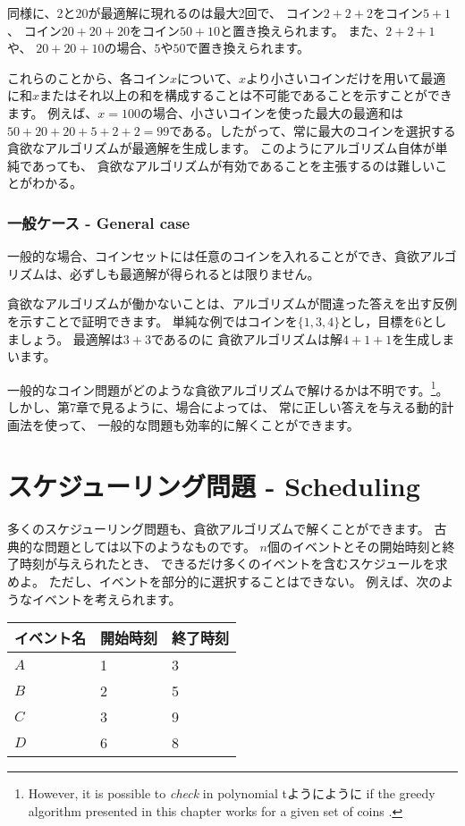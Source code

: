 同様に、2と20が最適解に現れるのは最大2回で、
コイン$2+2+2$をコイン$5+1$、
コイン$20+20+20$をコイン$50+10$と置き換えられます。
また、$2+2+1$ や、 $20+20+10$の場合、$5$や$50$で置き換えられます。

これらのことから、各コイン$x$について、$x$より小さいコインだけを用いて最適に和$x$またはそれ以上の和を構成することは不可能であることを示すことができます。
例えば、$x = 100$の場合、小さいコインを使った最大の最適和は$50+20+20+5+2+2 = 99$である。したがって、常に最大のコインを選択する貪欲なアルゴリズムが最適解を生成します。
このようにアルゴリズム自体が単純であっても、
貪欲なアルゴリズムが有効であることを主張するのは難しいことがわかる。

\subsubsection{一般ケース - General case}

一般的な場合、コインセットには任意のコインを入れることができ、貪欲アルゴリズムは、必ずしも最適解が得られるとは限りません。

貪欲なアルゴリズムが働かないことは、アルゴリズムが間違った答えを出す反例を示すことで証明できます。
単純な例ではコインを$\{1,3,4\}$とし，目標を6としましょう。
最適解は$3 + 3$であるのに
貪欲アルゴリズムは解$4 + 1 + 1$を生成しまいます。

一般的なコイン問題がどのような貪欲アルゴリズムで解けるかは不明です。\footnote{However, it is possible
to \emph{check} in polynomial tようにように
if the greedy algorithm presented in this chapter works for
a given set of coins \cite{pea05}.}。
しかし、第7章で見るように、場合によっては、 常に正しい答えを与える動的計画法を使って、
一般的な問題も効率的に解くことができます。

\section{スケジューリング問題 - Scheduling}

多くのスケジューリング問題も、貪欲アルゴリズムで解くことができます。
古典的な問題としては以下のようなものです。
$n$個のイベントとその開始時刻と終了時刻が与えられたとき、
できるだけ多くのイベントを含むスケジュールを求めよ。
ただし、イベントを部分的に選択することはできない。
例えば、次のようなイベントを考えられます。

\begin{center}
\begin{tabular}{lll}
イベント名 & 開始時刻 & 終了時刻 \\
\hline
$A$ & 1 & 3 \\
$B$ & 2 & 5 \\
$C$ & 3 & 9 \\
$D$ & 6 & 8 \\
\end{tabular}
\end{center}

